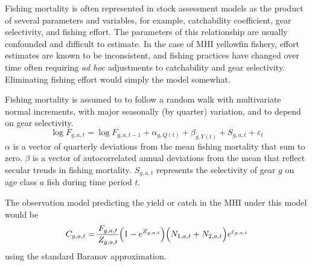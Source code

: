 \documentclass[12pt,letterpaper]{article}
\newcommand\MFCL{MULTIFAN-CL}
\begin{document}
Fishing mortality is often
represented in stock assessment models as the product of several
parameters and variables, for example, 
catchability coefficient, gear selectivity, and fishing
effort. The parameters of this relationship are usually confounded and
difficult to estimate. In the case of MHI yellowfin
fishery, effort estimates are known to be inconsistent, and fishing
practices have changed over time often
requiring {\it ad hoc}
adjustments to catchability and gear selectivity. Eliminating 
fishing effort would simply the model somewhat.

Fishing mortality is assumed to to follow a random walk with
multivariate normal increments, with major
seasonally (by quarter) variation, and to
depend on gear selectivity.
\begin{equation}
\log F_{g,a,t} = \log F_{g,a,t-1}+\alpha_{g,Q(t)}+\beta_{g,Y(t)}
+S_{g,a,t}+\varepsilon_t
\label{eqn:fmort}
\end{equation}
$\alpha$ is a vector of quarterly deviations from the mean
fishing mortality that sum to zero.
$\beta$ is a vector of autocorrelated annual deviations from the mean
that reflect secular trends in fishing mortality.
$S_{g,a,t}$ represents the selectivity of gear $g$ on age class $a$
fish during time period $t$.




The observation model predicting the yield or catch in the MHI
under 
this model would be
\begin{equation}
C_{g,a,t} =
\frac{F_{g,a,t}}{Z_{g,a,t}}\Big(1-e^{Z_{g,a,t}}\Big)\Big(N_{1,a,t}+N_{2,a,t}\Big)e^{\varepsilon_{g,a,t}}
\end{equation}
using the standard Baranov approximation.
\end{document}
